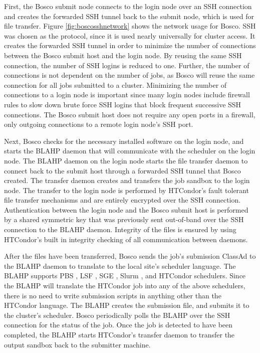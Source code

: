 First, the Bosco submit node connects to the login node over an SSH connection and creates the forwarded SSH tunnel back to the submit node, which is used for file transfer.  Figure \ref{fig:boscosshnetwork} shows the network usage for Bosco.  SSH was chosen as the protocol, since it is used nearly universally for cluster access.  It creates the forwarded SSH tunnel in order to minimize the number of connections between the Bosco submit host and the login node.  By reusing the same SSH connection, the number of SSH logins is reduced to one.  Further, the number of connections is not dependent on the number of jobs, as Bosco will reuse the same connection for all jobs submitted to a cluster.  Minimizing the number of connections to a login node is important since many login nodes include firewall rules to slow down brute force SSH logins that block frequent successive SSH connections.  The Bosco submit host does not require any open ports in a firewall, only outgoing connections to a remote login node's SSH port.



Next, Bosco checks for the necessary installed software on the login node, and starts the BLAHP \cite{blahp} daemon that will communicate with the scheduler on the login node.  The BLAHP daemon on the login node starts the file transfer daemon to connect back to the submit host through a forwarded SSH tunnel that Bosco created.  The transfer daemon creates and transfers the job sandbox to the login node.  The transfer to the login node is performed by HTCondor's fault tolerant file transfer mechanisms and are entirely encrypted over the SSH connection.  Authentication between the login node and the Bosco submit host is performed by a shared symmetric key that was previously sent out-of-band over the SSH connection to the BLAHP daemon.  Integrity of the files is ensured by using HTCondor's built in integrity checking of all communication between daemons.

After the files have been transferred, Bosco sends the job's submission ClassAd \cite{raman1998matchmaking} to the BLAHP daemon to translate to the local site's scheduler language.  The BLAHP supports PBS \cite{computing2013torque}, LSF \cite{computinglsf}, SGE \cite{gentzsch2001sun}, Slurm \cite{yoo2003slurm}, and HTCondor schedulers.  Since the BLAHP will translate the HTCondor job into any of the above schedulers, there is no need to write submission scripts in anything other than the HTCondor language.  The BLAHP creates the submission file, and submits it to the cluster's scheduler.  Bosco periodically polls the BLAHP over the SSH connection for the status of the job.  Once the job is detected to have been completed, the BLAHP starts HTCondor's transfer daemon to transfer the output sandbox back to the submitter machine.

